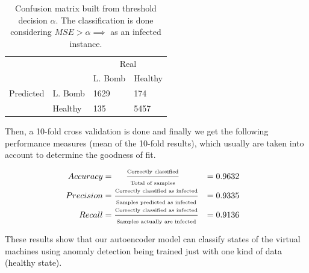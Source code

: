 \documentclass{iosart2c}
\begin{document}
\begin{table}[h!]
\centering
\begin{tabular}{llll}
                                                &                                 & \multicolumn{2}{c}{Real}                                       \\ \cline{3-4} 
                                                & \multicolumn{1}{l|}{}           & \multicolumn{1}{l|}{L. Bomb} & \multicolumn{1}{l|}{Healthy} \\ \cline{2-4} 
\multicolumn{1}{c|}{Predicted} & \multicolumn{1}{l|}{L. Bomb} & \multicolumn{1}{l|}{1629}       & \multicolumn{1}{l|}{174}     \\ \cline{2-4} 
\multicolumn{1}{c|}{}                           & \multicolumn{1}{l|}{Healthy}    & \multicolumn{1}{l|}{135}        & \multicolumn{1}{l|}{5457}    \\ \cline{2-4}
\end{tabular} 
\caption{Confusion matrix built from threshold decision $\alpha$. The classification is done considering  $MSE>\alpha\implies$ as an infected instance.}
\label{confusion_matrix}
\end{table}

Then, a 10-fold cross validation is done and finally we get the following performance measures (mean of the 10-fold results), which usually are taken into account to determine the goodness of fit.


\begin{equation*}
\begin{aligned}
\hspace{-0.3cm} Accuracy  &= \hspace{0.5cm} \frac{\text{\tiny{Correctly classified}}}{\text{\tiny{Total of samples}}}           &= 0.9632 \\
\hspace{-0.3cm} Precision &=\frac{\text{\tiny{Correctly classified as infected}}}{\text{\tiny{Samples predicted as infected}}} &= 0.9335\\
\hspace{-0.3cm} Recall    &=\frac{\text{\tiny{Correctly classified as infected}}}{\text{\tiny{Samples actually are infected}}} &= 0.9136\\
\end{aligned}
\end{equation*}

These results show that our autoencoder model can classify states of the virtual machines using anomaly detection being trained just with one kind of data (healthy state).
\end{document}

